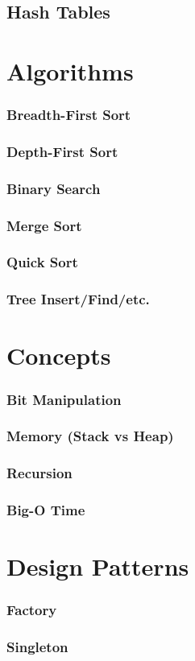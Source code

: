 \documentclass{article}
\begin{document}
\subsection{Hash Tables}

\section{Algorithms}

\subsubsection{Breadth-First Sort}

\subsubsection{Depth-First Sort}

\subsubsection{Binary Search}

\subsubsection{Merge Sort}

\subsubsection{Quick Sort}

\subsubsection{Tree Insert/Find/etc.}

\section{Concepts}

\subsubsection{Bit Manipulation}

\subsubsection{Memory (Stack vs Heap)}

\subsubsection{Recursion}

\subsubsection{Big-O Time}

\section{Design Patterns}

\subsubsection{Factory}

\subsubsection{Singleton}
\end{document}
